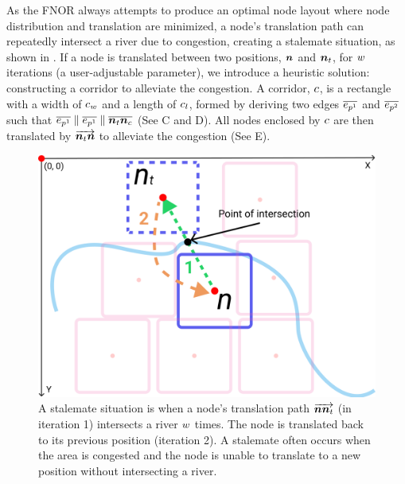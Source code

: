 As the FNOR always attempts to produce an optimal node layout where node distribution and translation are minimized, a node's translation path can repeatedly intersect a river due to congestion, creating a stalemate situation, as shown in . If a node is translated between two positions, $ \bm{n} $ and $ \bm{n}_t $, for $ w $ iterations (a user-adjustable parameter), we introduce a heuristic solution: constructing a corridor to alleviate the congestion. A corridor, $ c $, is a rectangle with a width of $ c_w $ and a length of $ c_l $, formed by deriving two edges $ \protect\overline{e_{p^1}} $ and $ \protect\overline{e_{p^2}} $ such that $ \protect\overline{e_{p^1}} \parallel \protect\overline{e_{p^1}} \parallel \protect\overline{\bm{n}_t\bm{n}_c} $ (See C and D). All nodes enclosed by $ c $ are then translated by $ \protect\overrightarrow{\bm{n}_t\bm{n}} $ to alleviate the congestion (See E).

{
\begin{figure}[tb!]
    \centering
    \includegraphics[width=\columnwidth]{figure/stalemate.png}
    \caption{A stalemate situation is when a node's translation path $ \protect\overrightarrow{\bm{n}\bm{n}_t} $ (in iteration 1) intersects a river $ w $ times. The node is translated back to its previous position (iteration 2). A stalemate often occurs when the area is congested and the node is unable to translate to a new position without intersecting a river.}
    \label{fig:stalemate}
\end{figure}
}

